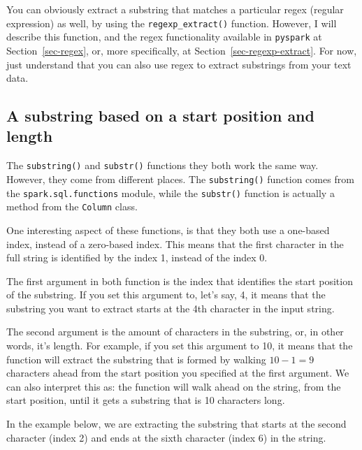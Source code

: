 \documentclass[
  11pt,
  letterpaper,
  DIV=11,
  numbers=noendperiod]{scrreprt}
\begin{document}
You can obviously extract a substring that matches a particular regex
(regular expression) as well, by using the \texttt{regexp\_extract()}
function. However, I will describe this function, and the regex
functionality available in \texttt{pyspark} at Section~\ref{sec-regex},
or, more specifically, at Section~\ref{sec-regexp-extract}. For now,
just understand that you can also use regex to extract substrings from
your text data.

\hypertarget{a-substring-based-on-a-start-position-and-length}{%
\subsection{A substring based on a start position and
length}\label{a-substring-based-on-a-start-position-and-length}}

The \texttt{substring()} and \texttt{substr()} functions they both work
the same way. However, they come from different places. The
\texttt{substring()} function comes from the
\texttt{spark.sql.functions} module, while the \texttt{substr()}
function is actually a method from the \texttt{Column} class.

One interesting aspect of these functions, is that they both use a
one-based index, instead of a zero-based index. This means that the
first character in the full string is identified by the index 1, instead
of the index 0.

The first argument in both function is the index that identifies the
start position of the substring. If you set this argument to, let's say,
4, it means that the substring you want to extract starts at the 4th
character in the input string.

The second argument is the amount of characters in the substring, or, in
other words, it's length. For example, if you set this argument to 10,
it means that the function will extract the substring that is formed by
walking \(10 - 1 = 9\) characters ahead from the start position you
specified at the first argument. We can also interpret this as: the
function will walk ahead on the string, from the start position, until
it gets a substring that is 10 characters long.

In the example below, we are extracting the substring that starts at the
second character (index 2) and ends at the sixth character (index 6) in
the string.
\end{document}
